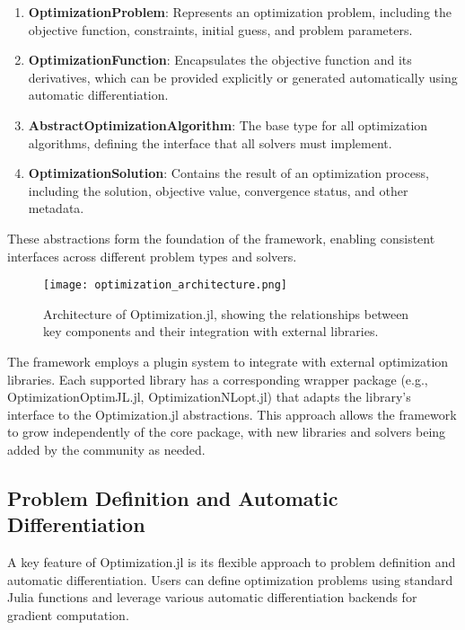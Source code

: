 \begin{enumerate}
\item \textbf{OptimizationProblem}: Represents an optimization problem, including the objective function, constraints, initial guess, and problem parameters.

\item \textbf{OptimizationFunction}: Encapsulates the objective function and its derivatives, which can be provided explicitly or generated automatically using automatic differentiation.

\item \textbf{AbstractOptimizationAlgorithm}: The base type for all optimization algorithms, defining the interface that all solvers must implement.

\item \textbf{OptimizationSolution}: Contains the result of an optimization process, including the solution, objective value, convergence status, and other metadata.
\end{enumerate}

These abstractions form the foundation of the framework, enabling consistent interfaces across different problem types and solvers.

\begin{figure}
\centering
\texttt{[image: optimization\_architecture.png]}
\caption{Architecture of Optimization.jl, showing the relationships between key components and their integration with external libraries.}
\label{fig:architecture}
\end{figure}

The framework employs a plugin system to integrate with external optimization libraries. Each supported library has a corresponding wrapper package (e.g., OptimizationOptimJL.jl, OptimizationNLopt.jl) that adapts the library's interface to the Optimization.jl abstractions. This approach allows the framework to grow independently of the core package, with new libraries and solvers being added by the community as needed.

\subsection{Problem Definition and Automatic Differentiation}

A key feature of Optimization.jl is its flexible approach to problem definition and automatic differentiation. Users can define optimization problems using standard Julia functions and leverage various automatic differentiation backends for gradient computation.

